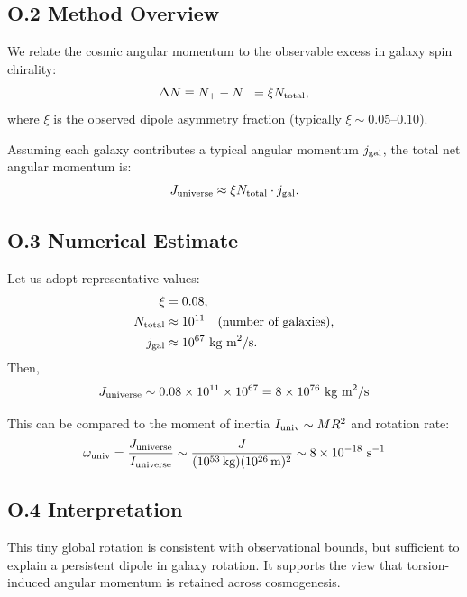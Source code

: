 \documentclass{article}
\begin{document}
\subsection*{O.2 Method Overview}
We relate the cosmic angular momentum to the observable excess in galaxy spin chirality:
\begin{equation}
\Delta N \equiv N_+ - N_- = \xi N_{\rm total},
\end{equation}
where $\xi$ is the observed dipole asymmetry fraction (typically $\xi \sim 0.05$--$0.10$).

Assuming each galaxy contributes a typical angular momentum $j_{\rm gal}$, the total net angular momentum is:
\begin{equation}
J_{\rm universe} \approx \xi N_{\rm total} \cdot j_{\rm gal}.
\end{equation}

\subsection*{O.3 Numerical Estimate}
Let us adopt representative values:
\begin{align*}
\xi &= 0.08, \\
N_{\rm total} &\approx 10^{11} \quad \text{(number of galaxies)}, \\
j_{\rm gal} &\approx 10^{67}~\text{kg m}^2\text{/s}.
\end{align*}
Then,
\begin{equation}
J_{\rm universe} \sim 0.08 \times 10^{11} \times 10^{67} = 8 \times 10^{76}~\text{kg m}^2\text{/s}
\end{equation}

This can be compared to the moment of inertia $I_{\rm univ} \sim MR^2$ and rotation rate:
\begin{equation}
\omega_{\rm univ} = \frac{J_{\rm universe}}{I_{\rm universe}} \sim \frac{J}{(10^{53}\,\text{kg})(10^{26}\,\text{m})^2} \sim 8 \times 10^{-18}~\text{s}^{-1}
\end{equation}

\subsection*{O.4 Interpretation}
This tiny global rotation is consistent with observational bounds, but sufficient to explain a persistent dipole in galaxy rotation. It supports the view that torsion-induced angular momentum is retained across cosmogenesis.
\end{document}
